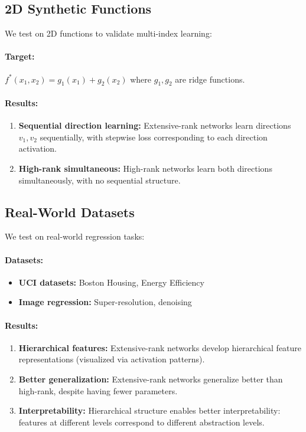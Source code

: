 \subsection{2D Synthetic Functions}

We test on 2D functions to validate multi-index learning:

\paragraph{Target:} $f^*(x_1, x_2) = g_1(x_1) + g_2(x_2)$ where $g_1, g_2$ are ridge functions.

\paragraph{Results:}
\begin{enumerate}
    \item \textbf{Sequential direction learning:} Extensive-rank networks learn directions $v_1, v_2$ sequentially, with stepwise loss corresponding to each direction activation.
    \item \textbf{High-rank simultaneous:} High-rank networks learn both directions simultaneously, with no sequential structure.
\end{enumerate}

\subsection{Real-World Datasets}

We test on real-world regression tasks:

\paragraph{Datasets:}
\begin{itemize}
    \item \textbf{UCI datasets:} Boston Housing, Energy Efficiency
    \item \textbf{Image regression:} Super-resolution, denoising
\end{itemize}

\paragraph{Results:}
\begin{enumerate}
    \item \textbf{Hierarchical features:} Extensive-rank networks develop hierarchical feature representations (visualized via activation patterns).
    \item \textbf{Better generalization:} Extensive-rank networks generalize better than high-rank, despite having fewer parameters.
    \item \textbf{Interpretability:} Hierarchical structure enables better interpretability: features at different levels correspond to different abstraction levels.
\end{enumerate}

